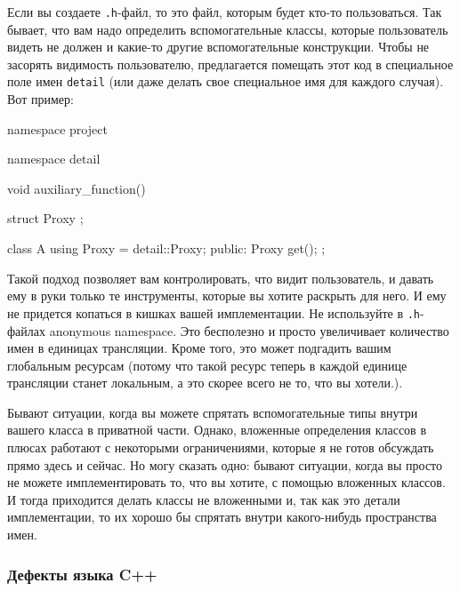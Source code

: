 Если вы создаете \verb".h"-файл, то это файл, которым будет кто-то пользоваться.
Так бывает, что вам надо определить вспомогательные классы, которые пользователь видеть не должен и какие-то другие вспомогательные конструкции.
Чтобы не засорять видимость пользователю, предлагается помещать этот код в специальное поле имен \verb"detail" (или даже делать свое специальное имя для каждого случая).
Вот пример:
\begin{cppcode}
namespace project {
namespace detail {
void auxiliary_function() {}

struct Proxy {};
}

class A {
  using Proxy = detail::Proxy;
public:
  Proxy get();
};
}
\end{cppcode}
Такой подход позволяет вам контролировать, что видит пользователь, и давать ему в руки только те инструменты, которые вы хотите раскрыть для него.
И ему не придется копаться в кишках вашей имплементации.
Не используйте в \verb".h"-файлах anonymous namespace.
Это бесполезно и просто увеличивает количество имен в единицах трансляции.
Кроме того, это может подгадить вашим глобальным ресурсам (потому что такой ресурс теперь в каждой единице трансляции станет локальным, а это скорее всего не то, что вы хотели.).

Бывают ситуации, когда вы можете спрятать вспомогательные типы внутри вашего класса в приватной части.
Однако, вложенные определения классов в плюсах работают с некоторыми ограничениями, которые я не готов обсуждать прямо здесь и сейчас.
Но могу сказать одно: бывают ситуации, когда вы просто не можете имплементировать то, что вы хотите, с помощью вложенных классов.
И тогда приходится делать классы не вложенными и, так как это детали имплементации, то их хорошо бы спрятать внутри какого-нибудь пространства имен.

\subsubsection{Дефекты языка C++}
\label{section::DefectCpp}

